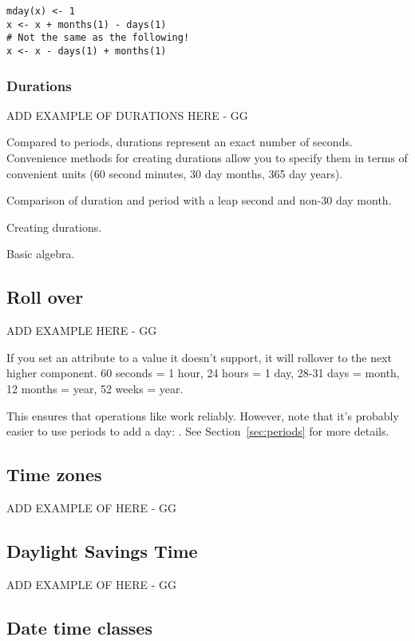 \documentclass[article]{jss}
\begin{document}
\begin{verbatim}
mday(x) <- 1
x <- x + months(1) - days(1)
# Not the same as the following!
x <- x - days(1) + months(1) 
\end{verbatim}


\subsubsection{Durations}
\label{sec:durations}

ADD EXAMPLE OF DURATIONS HERE - GG

Compared to periods, durations represent an exact number of seconds.  Convenience methods for creating durations allow you to specify them in terms of convenient units (60 second minutes, 30 day months, 365 day years).  

Comparison of duration and period with a leap second and non-30 day month.

Creating durations.

Basic algebra.


\subsection{Roll over}

ADD EXAMPLE HERE - GG

If you set an attribute to a value it doesn't support, it will rollover to the next higher component.  60 seconds = 1 hour, 24 hours = 1 day, 28-31 days = month, 12 months = year, 52 weeks = year.  

This ensures that operations like  work reliably.  However, note that it's probably easier to use periods to add a day: .  See Section~\ref{sec:periods} for more details.

\subsection{Time zones}

ADD EXAMPLE OF HERE - GG

\subsection{Daylight Savings Time}
\label{sec:DST}

ADD EXAMPLE OF HERE - GG


\subsection{Date time classes}
\end{document}
